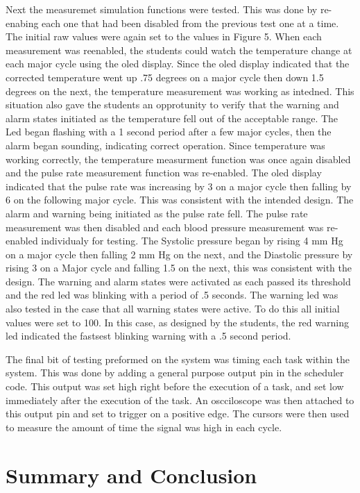 \documentclass[12pt]{article} %
\begin{document}
Next the measuremet simulation functions were tested. This was done by
re-enabing each one that had been disabled from the previous test one at a
time. The initial raw values were again set to the values in Figure 5. When
each measurement was reenabled, the students could watch the temperature change
at each major cycle using the oled display. Since the oled display indicated
that the corrected temperature went up .75 degrees on a major cycle then down
1.5 degrees on the next, the temperature measurement was working as intedned.
This situation also gave the students an opprotunity to verify that the warning
and alarm states initiated as the temperature fell out of the acceptable range.
The Led began flashing with a 1 second period after a few major cycles, then
the alarm began sounding, indicating correct operation. Since temperature was
working correctly, the temperature measurment function was once again disabled
and the pulse rate measurement function was re-enabled. The oled display
indicated that the pulse rate was increasing by 3 on a major cycle then falling
by 6 on the following major cycle. This was consistent with the intended
design. The alarm and warning being initiated as the pulse rate fell. The pulse
rate measurement was then disabled and each blood pressure measurement was
re-enabled individualy for testing. The Systolic pressure began by rising 4 mm
Hg on a major cycle then falling 2 mm Hg on the next, and the Diastolic
pressure by rising 3 on a Major cycle and falling 1.5 on the next, this was
consistent with the design. The warning and alarm states were activated as each
passed its threshold and the red led was blinking with a period of .5 seconds.
The warning led was also tested in the case that all warning states were
active. To do this all initial values were set to 100. In this case, as
designed by the students, the red warning led indicated the fastsest blinking
warning with a .5 second period. 

The final bit of testing preformed on the system was timing each task within
the system. This was done by adding a general purpose output pin in the
scheduler code. This output was set high right before the execution of a task,
and set low immediately after the execution of the task. An oscciloscope was
then attached to this output pin and set to trigger on a positive edge. The
cursors were then used to measure the amount of time the signal was high in
each cycle.

\section{Summary and Conclusion}
\end{document}
